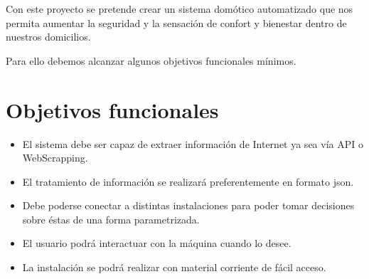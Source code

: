 
Con este proyecto se pretende crear un sistema domótico automatizado que nos permita aumentar la seguridad y la sensación de confort y bienestar dentro de nuestros domicilios.

Para ello debemos alcanzar algunos objetivos funcionales mínimos.

\section{Objetivos funcionales}

\begin{itemize}
    \item El sistema debe ser capaz de extraer información de Internet ya sea vía API o WebScrapping.
    \item El tratamiento de información se realizará preferentemente en formato json.
    \item Debe poderse conectar a distintas instalaciones para poder tomar decisiones sobre éstas de una forma parametrizada.
    \item El usuario podrá interactuar con la máquina cuando lo desee.
    \item La instalación se podrá realizar con material corriente de fácil acceso.
\end{itemize}

